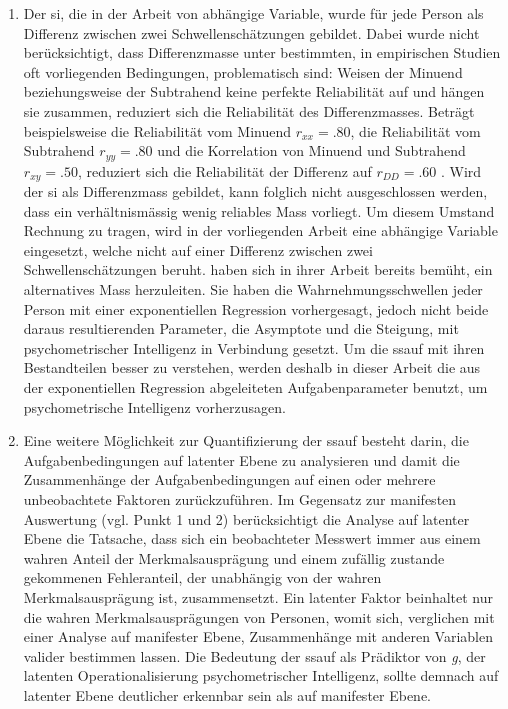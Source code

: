 \documentclass[11pt, twoside, a4paper]{book}		%
\begin{document}
\begin{enumerate}
	\item Der \gls{si}, die in der Arbeit von \citet{Melnick2013} abhängige Variable, wurde für jede Person als Differenz zwischen zwei Schwellenschätzungen gebildet. Dabei wurde nicht berücksichtigt, dass Differenzmasse unter bestimmten, in empirischen Studien oft vorliegenden Bedingungen, problematisch sind: Weisen der Minuend  beziehungsweise der Subtrahend keine perfekte Reliabilität auf und hängen sie zusammen, reduziert sich die Reliabilität des Differenzmasses. Beträgt beispielsweise die Reliabilität vom Minuend $r_{xx} = .80$, die Reliabilität vom Subtrahend $r_{yy} = .80$ und die Korrelation von Minuend und Subtrahend $r_{xy} = .50$, reduziert sich die Reliabilität der Differenz auf $r_{DD} = .60$ \citep[][ S. 145]{Murphy2005}. Wird der \gls{si} als Differenzmass gebildet, kann folglich nicht ausgeschlossen werden, dass ein verhältnismässig wenig reliables Mass vorliegt. Um diesem Umstand Rechnung zu tragen, wird in der vorliegenden Arbeit eine abhängige Variable eingesetzt, welche nicht auf einer Differenz zwischen zwei Schwellenschätzungen beruht. \citeauthor{Melnick2013} haben sich in ihrer Arbeit bereits bemüht, ein alternatives Mass herzuleiten. Sie haben die Wahrnehmungsschwellen jeder Person mit einer exponentiellen Regression vorhergesagt, jedoch nicht beide daraus resultierenden Parameter, die Asymptote und die Steigung, mit psychometrischer Intelligenz in Verbindung gesetzt. Um die \gls{ssauf} mit ihren Bestandteilen besser zu verstehen, werden deshalb in dieser Arbeit die aus der exponentiellen Regression abgeleiteten Aufgabenparameter benutzt, um psychometrische Intelligenz vorherzusagen.

	\item Eine weitere Möglichkeit zur Quantifizierung der \gls{ssauf} besteht darin, die Aufgabenbedingungen auf latenter Ebene zu analysieren und damit die Zusammenhänge der Aufgabenbedingungen auf einen oder mehrere unbeobachtete Faktoren zurückzuführen. Im Gegensatz zur manifesten Auswertung (vgl. Punkt 1 und 2) berücksichtigt die Analyse auf latenter Ebene die Tatsache, dass sich ein beobachteter Messwert immer aus einem wahren Anteil der Merkmalsausprägung und einem zufällig zustande gekommenen Fehleranteil, der unabhängig von der wahren Merkmalsausprägung ist, zusammensetzt. Ein latenter Faktor beinhaltet nur die wahren Merkmalsausprägungen von Personen, womit sich, verglichen mit einer Analyse auf manifester Ebene, Zusammenhänge mit anderen Variablen valider bestimmen lassen. Die Bedeutung der \gls{ssauf} als Prädiktor von \textit{g}, der latenten Operationalisierung psychometrischer Intelligenz, sollte demnach auf latenter Ebene deutlicher erkennbar sein als auf manifester Ebene.


\end{enumerate}
\end{document}
